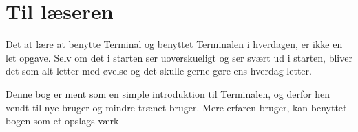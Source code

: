 \section*{Til læseren}
Det at lære at benytte Terminal og benyttet Terminalen i hverdagen, er ikke en let opgave. Selv om det i starten ser uoverskueligt og ser svært ud i starten, bliver det som alt letter med øvelse og det skulle gerne gøre ens hverdag letter. 

Denne bog er ment som en simple introduktion til Terminalen, og derfor hen vendt til nye bruger og mindre trænet bruger. Mere erfaren bruger, kan benyttet bogen som et opslags værk 
